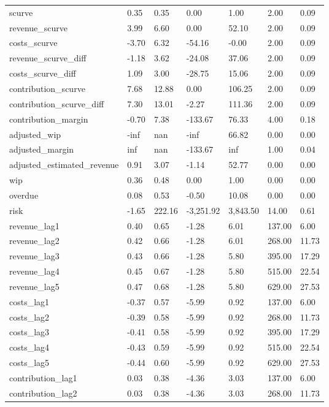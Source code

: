 \begin{landscape}
\begin{longtable}[h!]{lllllll}
scurve & 0.35 & 0.35 & 0.00 & 1.00 & 2.00 & 0.09 \\
revenue_scurve & 3.99 & 6.60 & 0.00 & 52.10 & 2.00 & 0.09 \\
costs_scurve & -3.70 & 6.32 & -54.16 & -0.00 & 2.00 & 0.09 \\
revenue_scurve_diff & -1.18 & 3.62 & -24.08 & 37.06 & 2.00 & 0.09 \\
costs_scurve_diff & 1.09 & 3.00 & -28.75 & 15.06 & 2.00 & 0.09 \\
contribution_scurve & 7.68 & 12.88 & 0.00 & 106.25 & 2.00 & 0.09 \\
contribution_scurve_diff & 7.30 & 13.01 & -2.27 & 111.36 & 2.00 & 0.09 \\
contribution_margin & -0.70 & 7.38 & -133.67 & 76.33 & 4.00 & 0.18 \\
adjusted_wip & -inf & nan & -inf & 66.82 & 0.00 & 0.00 \\
adjusted_margin & inf & nan & -133.67 & inf & 1.00 & 0.04 \\
adjusted_estimated_revenue & 0.91 & 3.07 & -1.14 & 52.77 & 0.00 & 0.00 \\
wip & 0.36 & 0.48 & 0.00 & 1.00 & 0.00 & 0.00 \\
overdue & 0.08 & 0.53 & -0.50 & 10.08 & 0.00 & 0.00 \\
risk & -1.65 & 222.16 & -3,251.92 & 3,843.50 & 14.00 & 0.61 \\
revenue_lag1 & 0.40 & 0.65 & -1.28 & 6.01 & 137.00 & 6.00 \\
revenue_lag2 & 0.42 & 0.66 & -1.28 & 6.01 & 268.00 & 11.73 \\
revenue_lag3 & 0.43 & 0.66 & -1.28 & 5.80 & 395.00 & 17.29 \\
revenue_lag4 & 0.45 & 0.67 & -1.28 & 5.80 & 515.00 & 22.54 \\
revenue_lag5 & 0.47 & 0.68 & -1.28 & 5.80 & 629.00 & 27.53 \\
costs_lag1 & -0.37 & 0.57 & -5.99 & 0.92 & 137.00 & 6.00 \\
costs_lag2 & -0.39 & 0.58 & -5.99 & 0.92 & 268.00 & 11.73 \\
costs_lag3 & -0.41 & 0.58 & -5.99 & 0.92 & 395.00 & 17.29 \\
costs_lag4 & -0.43 & 0.59 & -5.99 & 0.92 & 515.00 & 22.54 \\
costs_lag5 & -0.44 & 0.60 & -5.99 & 0.92 & 629.00 & 27.53 \\
contribution_lag1 & 0.03 & 0.38 & -4.36 & 3.03 & 137.00 & 6.00 \\
contribution_lag2 & 0.03 & 0.38 & -4.36 & 3.03 & 268.00 & 11.73 \\

\end{longtable}
\end{landscape}

